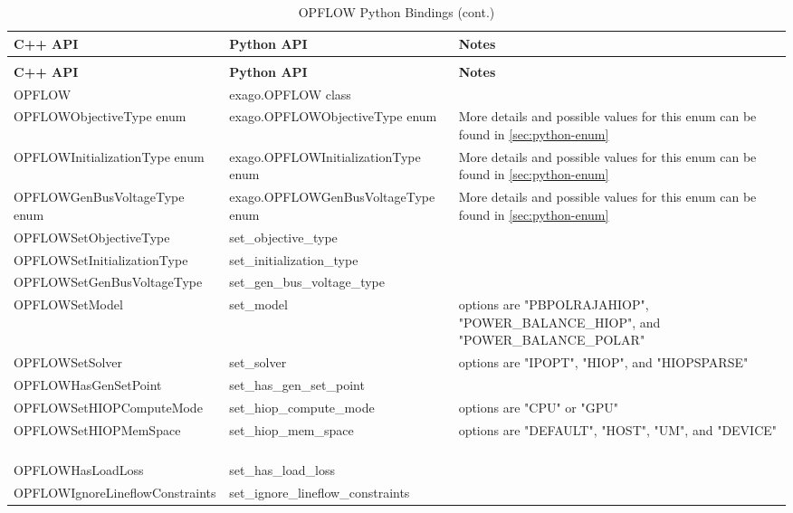 { \footnotesize
  \begin{longtable}{|>{\ttfamily}p{}|>{\ttfamily}p{}|p{}|}
    \caption{OPFLOW Python Bindings}
    \label{table:opflow-python-bindings } \\
    \hline
    \textbf{\textrm{C++ API}} & \textbf{\textrm{Python API}} & \textbf{Notes}\\ [0.5ex]  
    \hline
    \endfirsthead
    \caption{OPFLOW Python Bindings (cont.)} \\
    \hline
    \textbf{\textrm{C++ API}} & \textbf{\textrm{Python API}} & \textbf{Notes}\\ [0.5ex]  
    \hline
    \endhead
    OPFLOW & exago.OPFLOW class &  ~\\
    \hline
    OPFLOWObjectiveType enum & exago.OPFLOWObjectiveType enum & More details and possible values for this enum can be found in \ref{sec:python-enum} ~\\
    \hline
    OPFLOWInitializationType enum & exago.OPFLOWInitializationType enum & More details and possible values for this enum can be found in \ref{sec:python-enum} ~\\
    \hline
    OPFLOWGenBusVoltageType enum & exago.OPFLOWGenBusVoltageType enum & More details and possible values for this enum can be found in \ref{sec:python-enum} ~\\
    \hline
    OPFLOWSetObjectiveType & set\_objective\_type & ~\\
    \hline
    OPFLOWSetInitializationType & set\_initialization\_type & ~\\
    \hline
    OPFLOWSetGenBusVoltageType & set\_gen\_bus\_voltage\_type & ~\\
    \hline
    OPFLOWSetModel & set\_model & options are "PBPOLRAJAHIOP", "POWER\_BALANCE\_HIOP", and "POWER\_BALANCE\_POLAR" ~\\
    \hline
    OPFLOWSetSolver & set\_solver & options are "IPOPT", "HIOP", and "HIOPSPARSE" ~\\
    \hline
    OPFLOWHasGenSetPoint & set\_has\_gen\_set\_point & ~\\
    \hline
    OPFLOWSetHIOPComputeMode & set\_hiop\_compute\_mode & options are "CPU" or "GPU" ~\\
    \hline
    OPFLOWSetHIOPMemSpace & set\_hiop\_mem\_space & options are "DEFAULT", "HOST", "UM", and "DEVICE" ~\\
    \hline
    OPFLOWHasLoadLoss & set\_has\_load\_loss & ~\\
    \hline
    OPFLOWIgnoreLineflowConstraints & set\_ignore\_lineflow\_constraints & ~\\

\end{longtable}}
